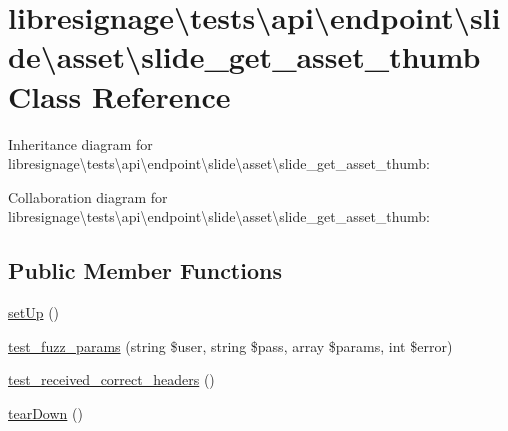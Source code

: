 \hypertarget{classlibresignage_1_1tests_1_1api_1_1endpoint_1_1slide_1_1asset_1_1slide__get__asset__thumb}{}\section{libresignage\textbackslash{}tests\textbackslash{}api\textbackslash{}endpoint\textbackslash{}slide\textbackslash{}asset\textbackslash{}slide\+\_\+get\+\_\+asset\+\_\+thumb Class Reference}
\label{classlibresignage_1_1tests_1_1api_1_1endpoint_1_1slide_1_1asset_1_1slide__get__asset__thumb}


Inheritance diagram for libresignage\textbackslash{}tests\textbackslash{}api\textbackslash{}endpoint\textbackslash{}slide\textbackslash{}asset\textbackslash{}slide\+\_\+get\+\_\+asset\+\_\+thumb\+:


Collaboration diagram for libresignage\textbackslash{}tests\textbackslash{}api\textbackslash{}endpoint\textbackslash{}slide\textbackslash{}asset\textbackslash{}slide\+\_\+get\+\_\+asset\+\_\+thumb\+:
\subsection*{Public Member Functions}
\begin{DoxyCompactItemize}
\item 
\hyperlink{classlibresignage_1_1tests_1_1api_1_1endpoint_1_1slide_1_1asset_1_1slide__get__asset__thumb_a2b9bf085b1e93c64a22b7834cc85664d}{set\+Up} ()
\item 
\hyperlink{classlibresignage_1_1tests_1_1api_1_1endpoint_1_1slide_1_1asset_1_1slide__get__asset__thumb_aa5bd79ee4e59af92f760729967ef911b}{test\+\_\+fuzz\+\_\+params} (string \$user, string \$pass, array \$params, int \$error)
\item 
\hyperlink{classlibresignage_1_1tests_1_1api_1_1endpoint_1_1slide_1_1asset_1_1slide__get__asset__thumb_a3fc7ebb035e54130c440230a884f8792}{test\+\_\+received\+\_\+correct\+\_\+headers} ()
\item 
\hyperlink{classlibresignage_1_1tests_1_1api_1_1endpoint_1_1slide_1_1asset_1_1slide__get__asset__thumb_a356a3e6411586627ee09ac220300eb37}{tear\+Down} ()
\end{DoxyCompactItemize}
